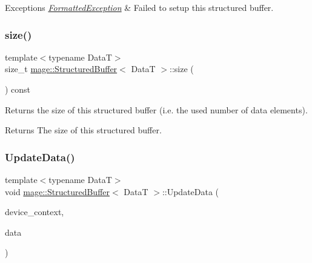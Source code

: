 \begin{DoxyExceptions}{Exceptions}
{\em \hyperlink{classmage_1_1_formatted_exception}{Formatted\+Exception}} & Failed to setup this structured buffer. \\
\hline
\end{DoxyExceptions}
\hypertarget{structmage_1_1_structured_buffer_a1e9ccab07c0f78ff1a8e4d8a0590f79e}{}\label{structmage_1_1_structured_buffer_a1e9ccab07c0f78ff1a8e4d8a0590f79e} 
\subsubsection{\texorpdfstring{size()}{size()}}
{\footnotesize\ttfamily template$<$typename DataT$>$ \\
size\+\_\+t \hyperlink{structmage_1_1_structured_buffer}{mage\+::\+Structured\+Buffer}$<$ DataT $>$\+::size (\begin{DoxyParamCaption}{ }\end{DoxyParamCaption}) const\hspace{0.3cm}{\ttfamily [noexcept]}}

Returns the size of this structured buffer (i.\+e. the used number of data elements).

\begin{DoxyReturn}{Returns}
The size of this structured buffer. 
\end{DoxyReturn}
\hypertarget{structmage_1_1_structured_buffer_ae7cc4d45f8303c7d9e1b2c2b3e485714}{}\label{structmage_1_1_structured_buffer_ae7cc4d45f8303c7d9e1b2c2b3e485714} 
\subsubsection{\texorpdfstring{Update\+Data()}{UpdateData()}\hspace{0.1cm}{\footnotesize\ttfamily [1/2]}}
{\footnotesize\ttfamily template$<$typename DataT$>$ \\
void \hyperlink{structmage_1_1_structured_buffer}{mage\+::\+Structured\+Buffer}$<$ DataT $>$\+::Update\+Data (\begin{DoxyParamCaption}\item[{I\+D3\+D11\+Device\+Context4 $\ast$}]{device\+\_\+context,  }\item[{const vector$<$ DataT $>$ \&}]{data }\end{DoxyParamCaption})}

